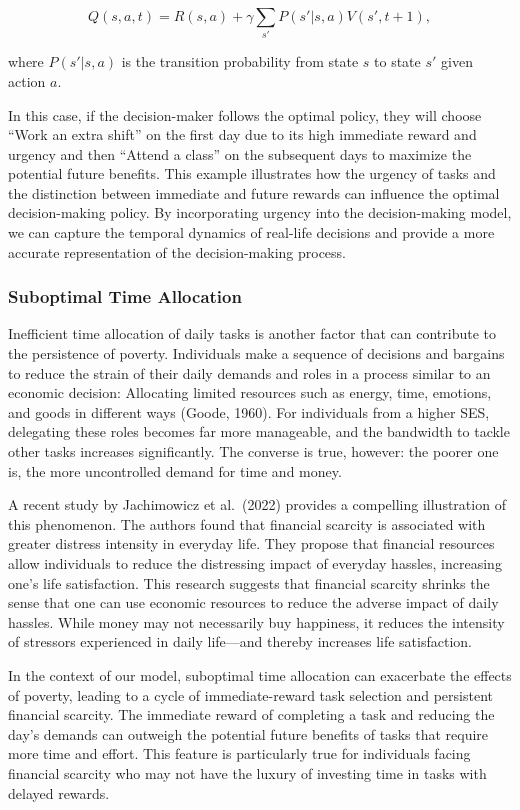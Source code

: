\documentclass[
]{article}
\begin{document}
\[Q(s, a, t) = R(s, a) + \gamma \sum_{s'} P(s' | s, a) V(s', t+1),\]

where \(P(s' | s, a)\) is the transition probability from state \(s\) to
state \(s'\) given action \(a\).

In this case, if the decision-maker follows the optimal policy, they
will choose ``Work an extra shift'' on the first day due to its high
immediate reward and urgency and then ``Attend a class'' on the
subsequent days to maximize the potential future benefits. This example
illustrates how the urgency of tasks and the distinction between
immediate and future rewards can influence the optimal decision-making
policy. By incorporating urgency into the decision-making model, we can
capture the temporal dynamics of real-life decisions and provide a more
accurate representation of the decision-making process.

\hypertarget{suboptimal-time-allocation}{%
\subsubsection{Suboptimal Time
Allocation}\label{suboptimal-time-allocation}}

Inefficient time allocation of daily tasks is another factor that can
contribute to the persistence of poverty. Individuals make a sequence of
decisions and bargains to reduce the strain of their daily demands and
roles in a process similar to an economic decision: Allocating limited
resources such as energy, time, emotions, and goods in different ways
(Goode, 1960). For individuals from a higher SES, delegating these roles
becomes far more manageable, and the bandwidth to tackle other tasks
increases significantly. The converse is true, however: the poorer one
is, the more uncontrolled demand for time and money.

A recent study by Jachimowicz et al.~(2022) provides a compelling
illustration of this phenomenon. The authors found that financial
scarcity is associated with greater distress intensity in everyday life.
They propose that financial resources allow individuals to reduce the
distressing impact of everyday hassles, increasing one's life
satisfaction. This research suggests that financial scarcity shrinks the
sense that one can use economic resources to reduce the adverse impact
of daily hassles. While money may not necessarily buy happiness, it
reduces the intensity of stressors experienced in daily life---and
thereby increases life satisfaction.

In the context of our model, suboptimal time allocation can exacerbate
the effects of poverty, leading to a cycle of immediate-reward task
selection and persistent financial scarcity. The immediate reward of
completing a task and reducing the day's demands can outweigh the
potential future benefits of tasks that require more time and effort.
This feature is particularly true for individuals facing financial
scarcity who may not have the luxury of investing time in tasks with
delayed rewards.
\end{document}
